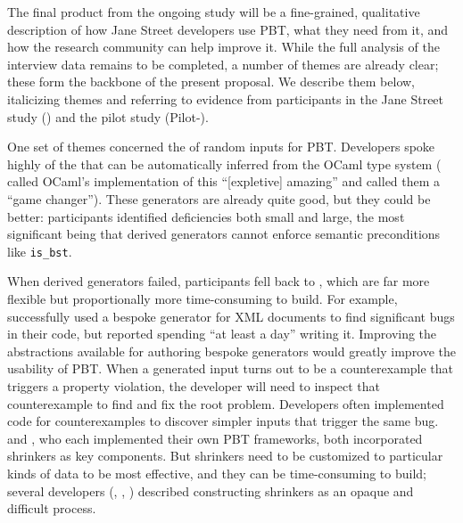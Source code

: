 The final product from
the ongoing study will be a fine-grained, qualitative description of how
Jane Street developers use PBT, what they need from it, and how the
research community can
help improve it.  While the full analysis of the interview data remains
to be completed, a number of themes are already clear; these
form the backbone of the present proposal. We describe them below,
italicizing themes and
referring to evidence from participants in the Jane Street study
()
and the pilot study (Pilot-).

One set of themes concerned the  of
random inputs for PBT. Developers spoke
highly of the  that can be automatically
inferred from
the OCaml type system ( called OCaml's implementation of this
``[expletive] amazing'' and  called them a ``game changer'').
These generators are already quite good, but they could be better: participants
identified deficiencies both small and large, the most significant being that
derived generators
cannot enforce semantic preconditions like \lstinline{is_bst}.

When derived generators
failed, participants fell back to , which
are far more flexible but proportionally more time-consuming to
build. For example,  successfully used a bespoke
generator for XML documents to find significant bugs in their code,
but reported spending ``at least a day'' writing it.
Improving the abstractions available for authoring bespoke generators would
greatly improve the usability of PBT.
%
When a generated input turns out to be a counterexample that triggers
a property violation, the developer will need to inspect that
counterexample to find
and fix the root problem. Developers often implemented code for
 counterexamples to discover
simpler inputs that trigger the same bug.  
and , who each implemented their own PBT frameworks, both
incorporated shrinkers as key components. But
shrinkers need to be customized to particular kinds of data to be most
effective, and they can be time-consuming to build; several
developers
(,  , )
described constructing shrinkers as an opaque and difficult process.

